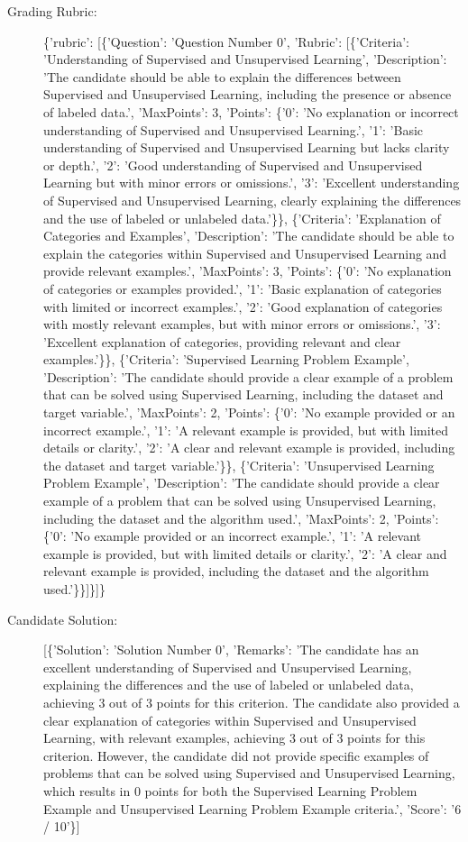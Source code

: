 \documentclass{article}%
\begin{document}
\begin{description}
\item[Grading Rubric: ]%
\{'rubric': {[}\{'Question': 'Question Number 0', 'Rubric': {[}\{'Criteria': 'Understanding of Supervised and Unsupervised Learning', 'Description': 'The candidate should be able to explain the differences between Supervised and Unsupervised Learning, including the presence or absence of labeled data.', 'MaxPoints': 3, 'Points': \{'0': 'No explanation or incorrect understanding of Supervised and Unsupervised Learning.', '1': 'Basic understanding of Supervised and Unsupervised Learning but lacks clarity or depth.', '2': 'Good understanding of Supervised and Unsupervised Learning but with minor errors or omissions.', '3': 'Excellent understanding of Supervised and Unsupervised Learning, clearly explaining the differences and the use of labeled or unlabeled data.'\}\}, \{'Criteria': 'Explanation of Categories and Examples', 'Description': 'The candidate should be able to explain the categories within Supervised and Unsupervised Learning and provide relevant examples.', 'MaxPoints': 3, 'Points': \{'0': 'No explanation of categories or examples provided.', '1': 'Basic explanation of categories with limited or incorrect examples.', '2': 'Good explanation of categories with mostly relevant examples, but with minor errors or omissions.', '3': 'Excellent explanation of categories, providing relevant and clear examples.'\}\}, \{'Criteria': 'Supervised Learning Problem Example', 'Description': 'The candidate should provide a clear example of a problem that can be solved using Supervised Learning, including the dataset and target variable.', 'MaxPoints': 2, 'Points': \{'0': 'No example provided or an incorrect example.', '1': 'A relevant example is provided, but with limited details or clarity.', '2': 'A clear and relevant example is provided, including the dataset and target variable.'\}\}, \{'Criteria': 'Unsupervised Learning Problem Example', 'Description': 'The candidate should provide a clear example of a problem that can be solved using Unsupervised Learning, including the dataset and the algorithm used.', 'MaxPoints': 2, 'Points': \{'0': 'No example provided or an incorrect example.', '1': 'A relevant example is provided, but with limited details or clarity.', '2': 'A clear and relevant example is provided, including the dataset and the algorithm used.'\}\}{]}\}{]}\}%
\item[Candidate Solution: ]%
{[}\{'Solution': 'Solution Number 0', 'Remarks': 'The candidate has an excellent understanding of Supervised and Unsupervised Learning, explaining the differences and the use of labeled or unlabeled data, achieving 3 out of 3 points for this criterion. The candidate also provided a clear explanation of categories within Supervised and Unsupervised Learning, with relevant examples, achieving 3 out of 3 points for this criterion. However, the candidate did not provide specific examples of problems that can be solved using Supervised and Unsupervised Learning, which results in 0 points for both the Supervised Learning Problem Example and Unsupervised Learning Problem Example criteria.', 'Score': '6 / 10'\}{]}%

\end{description}
\end{document}
